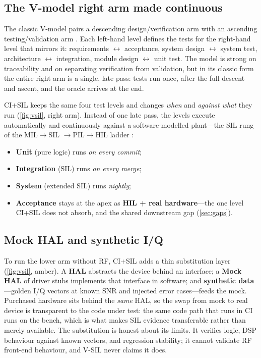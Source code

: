 \documentclass[11pt,a4paper]{article}
\begin{document}
\subsection{The V-model right arm made continuous}
\label{sec:continuous}

The classic V-model pairs a descending design/verification arm with an ascending
testing/validation arm \cite{qmsdoc2026,sheridan2026b}. Each left-hand level defines the tests
for the right-hand level that mirrors it: requirements $\leftrightarrow$ acceptance, system
design $\leftrightarrow$ system test, architecture $\leftrightarrow$ integration, module design
$\leftrightarrow$ unit test. The model is strong on traceability and on separating verification
from validation, but in its classic form the entire right arm is a single, late pass: tests run
once, after the full descent and ascent, and the oracle arrives at the end.

CI+SIL keeps the same four test levels and changes \emph{when} and \emph{against what} they run
(\cref{fig:vsil}, right arm). Instead of one late pass, the levels execute automatically and
continuously against a software-modelled plant---the SIL rung of the MIL$\rightarrow$SIL
$\rightarrow$PIL$\rightarrow$HIL ladder \cite{opalrt2026,sheridan2026a}:

\begin{itemize}
  \item \textbf{Unit} (pure logic) runs \emph{on every commit};
  \item \textbf{Integration} (SIL) runs \emph{on every merge};
  \item \textbf{System} (extended SIL) runs \emph{nightly};
  \item \textbf{Acceptance} stays at the apex as \textbf{HIL + real hardware}---the one level
    CI+SIL does not absorb, and the shared downstream gap (\cref{sec:gaps}).
\end{itemize}

\subsection{Mock HAL and synthetic I/Q}
\label{sec:mockhal}

To run the lower arm without RF, CI+SIL adds a thin substitution layer (\cref{fig:vsil},
amber). A \textbf{HAL} abstracts the device behind an interface; a \textbf{Mock HAL} of driver
stubs implements that interface in software; and \textbf{synthetic data}---golden I/Q vectors at
known SNR and injected error cases---feeds the mock. Purchased hardware sits behind the
\emph{same} HAL, so the swap from mock to real device is transparent to the code under test:
the same code path that runs in CI runs on the bench, which is what makes SIL evidence
transferable rather than merely available. The substitution is honest about its limits. It
verifies logic, DSP behaviour against known vectors, and regression stability; it cannot
validate RF front-end behaviour, and V-SIL never claims it does.
\end{document}

